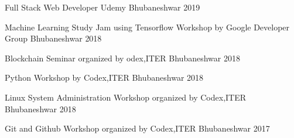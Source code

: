 

\begin{cvhonors}

  \cvhonor
    {Full Stack Web Developer} %
    {Udemy} %
    {Bhubaneshwar} %
    {2019} %

  \cvhonor
    {Machine Learning Study Jam using Tensorflow} %
    {Workshop by Google Developer Group} %
    {Bhubaneshwar} %
    {2018} %

  \cvhonor
    {Blockchain} %
    {Seminar organized by odex,ITER} %
    {Bhubaneshwar} %
    {2018} %

  \cvhonor
    {Python} %
    {Workshop by Codex,ITER} %
    {Bhubaneshwar} %
    {2018} %

  \cvhonor
    {Linux System Administration} %
    {Workshop organized by Codex,ITER} %
    {Bhubaneshwar} %
    {2018} %

 \cvhonor
    {Git and Github} %
    {Workshop organized by Codex,ITER} %
    {Bhubaneshwar} %
    {2017} %
    
    

\end{cvhonors}
